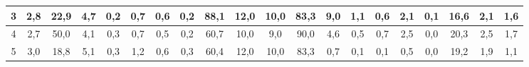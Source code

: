 \begin{sidewaystable}[]
\begin{tabular}{|c|c|c|c|c|c|c|c|c|c|c|c|c|c|c|c|c|c|c|c|}
    3  & 2,8                                              & 22,9                                             & 4,7                                              & 0,2                                              & 0,7                                              & 0,6                                              & 0,2                                              & 88,1                                            & 12,0                                            & 10,0                                            & 83,3                                            & 9,0                                             & 1,1                                             & 0,6                                             & 2,1                                             & 0,1                                             & 16,6                                             & 2,1                                              & 1,6                                              \\ \hline
    4  & 2,7                                              & 50,0                                             & 4,1                                              & 0,3                                              & 0,7                                              & 0,5                                              & 0,2                                              & 60,7                                            & 10,0                                            & 9,0                                             & 90,0                                            & 4,6                                             & 0,5                                             & 0,7                                             & 2,5                                             & 0,0                                             & 20,3                                             & 2,5                                              & 1,7                                              \\ \hline
    5  & 3,0                                              & 18,8                                             & 5,1                                              & 0,3                                              & 1,2                                              & 0,6                                              & 0,3                                              & 60,4                                            & 12,0                                            & 10,0                                            & 83,3                                            & 0,7                                             & 0,1                                             & 0,1                                             & 0,5                                             & 0,0                                             & 19,2                                             & 1,9                                              & 1,1                                              \\ \hline

\end{tabular}
\end{sidewaystable}
